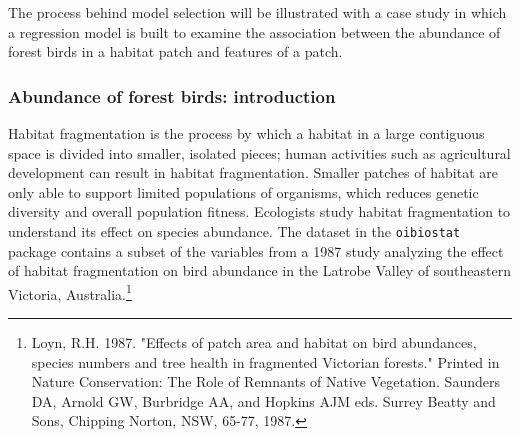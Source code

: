 The process behind model selection will be illustrated with a case study in which a regression model is built to examine the association between the abundance of forest birds in a habitat patch and features of a patch. 

\subsubsection{Abundance of forest birds: introduction}

Habitat fragmentation is the process by which a habitat in a large contiguous space is divided into smaller, isolated pieces; human activities such as agricultural development can result in habitat fragmentation. Smaller patches of habitat are only able to support limited populations of organisms, which reduces genetic diversity and overall population fitness. Ecologists study habitat fragmentation to understand its effect on species abundance. The  dataset in the \texttt{oibiostat} package contains a subset of the variables from a 1987 study analyzing the effect of habitat fragmentation on bird abundance in the Latrobe Valley of southeastern Victoria, Australia.\footnote{Loyn, R.H. 1987. "Effects of patch area and habitat on bird abundances, species numbers and tree health in fragmented Victorian forests." Printed in Nature Conservation: The Role of Remnants of Native Vegetation. Saunders DA, Arnold GW, Burbridge AA, and Hopkins AJM eds. Surrey Beatty and Sons, Chipping Norton, NSW, 65-77, 1987.}

